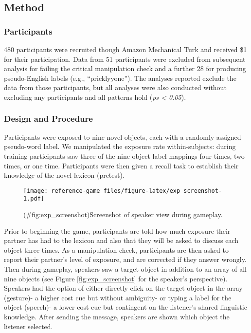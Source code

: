 \documentclass[english,,man,floatsintext]{apa6}
\begin{document}
\hypertarget{method}{%
\subsection{Method}\label{method}}

\hypertarget{participants-1}{%
\subsubsection{Participants}\label{participants-1}}

480 participants were recruited though Amazon Mechanical Turk and received \$1 for their participation. Data from 51 participants were excluded from subsequent analysis for failing the critical manipulation check and a further 28 for producing pseudo-English labels (e.g., \enquote{pricklyyone}). The analyses reported exclude the data from those participants, but all analyses were also conducted without excluding any participants and all patterns hold (\emph{ps \textless{} 0.05}).

\hypertarget{design-and-procedure}{%
\subsubsection{Design and Procedure}\label{design-and-procedure}}

Participants were exposed to nine novel objects, each with a randomly assigned pseudo-word label. We manipulated the exposure rate within-subjects: during training participants saw three of the nine object-label mappings four times, two times, or one time. Participants were then given a recall task to establish their knowledge of the novel lexicon (pretest).

\begin{figure}
\centering
\texttt{[image: reference-game\_files/figure-latex/exp\_screenshot-1.pdf]}
\caption{(\#fig:exp\_screenshot)Screenshot of speaker view during gameplay.}
\end{figure}

Prior to beginning the game, participants are told how much exposure their partner has had to the lexicon and also that they will be asked to discuss each object three times. As a manipulation check, participants are then asked to report their partner's level of exposure, and are corrected if they answer wrongly. Then during gameplay, speakers saw a target object in addition to an array of all nine objects (see Figure \ref{fig:exp_screenshot} for the speaker's perspective). Speakers had the option of either directly click on the target object in the array (gesture)- a higher cost cue but without ambiguity- or typing a label for the object (speech)- a lower cost cue but contingent on the listener's shared linguistic knowledge. After sending the message, speakers are shown which object the listener selected.
\end{document}
